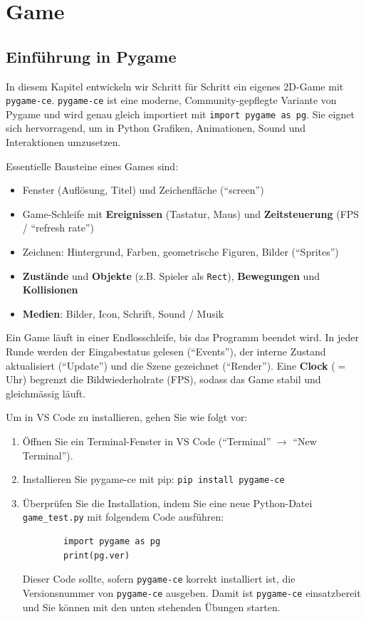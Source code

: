 \chapter{Game}\label{ch:K08_Game}

\section{Einführung in Pygame}
In diesem Kapitel entwickeln wir Schritt für Schritt ein eigenes 2D-Game mit \texttt{pygame-ce}. \texttt{pygame-ce} ist eine moderne, Community-gepflegte Variante von Pygame und wird genau gleich importiert mit \lstinline|import pygame as pg|. Sie eignet sich hervorragend, um in Python Grafiken, Animationen, Sound und Interaktionen umzusetzen.

Essentielle Bausteine eines Games sind:
\begin{itemize}
    \item Fenster (Auflösung, Titel) und Zeichenfläche (\enquote{screen})
    \item Game-Schleife mit \textbf{Ereignissen} (Tastatur, Maus) und \textbf{Zeitsteuerung} (\gls{FPS} / \enquote{refresh rate})
    \item Zeichnen: Hintergrund, Farben, geometrische Figuren, Bilder (\enquote{Sprites})
    \item \textbf{Zustände} und \textbf{Objekte} (z.B. Spieler als \lstinline|Rect|), \textbf{Bewegungen} und \textbf{Kollisionen}
    \item \textbf{Medien}: Bilder, Icon, Schrift, Sound / Musik
\end{itemize}

\begin{mydefinition}
Ein Game läuft in einer Endlosschleife, bis das Programm beendet wird. In jeder Runde werden der Eingabestatus gelesen (\enquote{Events}), der interne Zustand aktualisiert (\enquote{Update}) und die Szene gezeichnet (\enquote{Render}). Eine \textbf{Clock} ($=$ Uhr) begrenzt die Bildwiederholrate (\gls{FPS}), sodass das Game stabil und gleichmässig läuft.
\end{mydefinition}

Um  in VS Code zu installieren, gehen Sie wie folgt vor:

\begin{enumerate}
    \item Öffnen Sie ein Terminal-Fenster in VS Code (\enquote{Terminal} $\rightarrow$ \enquote{New Terminal}).
    \item Installieren Sie pygame-ce mit pip:
          \lstinline|pip install pygame-ce|
    \item Überprüfen Sie die Installation, indem Sie eine neue Python-Datei \texttt{game\_test.py} mit folgendem Code ausführen:
          \begin{lstlisting}
        import pygame as pg
        print(pg.ver)
        \end{lstlisting}
          Dieser Code sollte, sofern \texttt{pygame-ce} korrekt installiert ist, die Versionsnummer von \texttt{pygame-ce} ausgeben. Damit ist \texttt{pygame-ce} einsatzbereit und Sie können mit den unten stehenden Übungen starten.
\end{enumerate}

